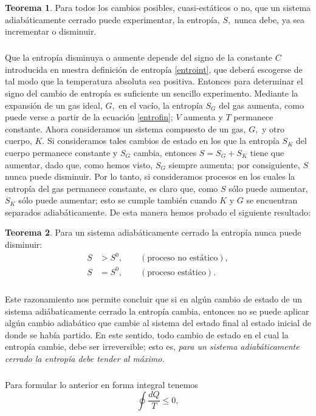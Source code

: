 \documentclass{article}
\theoremstyle{definition} \newtheorem{defi}{Definici\'on}
\theoremstyle{definition} \newtheorem{teo}{Teorema}
\theoremstyle{definition} \newtheorem{cor}{Corolario}
\begin{document}
\begin{teo}
Para todos los cambios posibles, cuasi-est\'aticos o no, que un sistema adiab\'aticamente cerrado puede experimentar, la entrop\'ia, $S,$ nunca debe, ya sea incrementar o disminuir.
\end{teo}
\subparagraph{}
Que la entrop\'ia disminuya o aumente depende del signo de la constante $C$ introducida en nuestra definici\'on de entrop\'ia \eqref{entroint}, que deber\'a escogerse de tal modo que la temperatura absoluta sea positiva. Entonces para determinar el signo del cambio de entrop\'ia es suficiente un sencillo experimento. Mediante la expansi\'on de un gas ideal, $G,$ en el vac\'io, la entrop\'ia $S_G$ del gas aumenta, como puede verse a partir de la ecuaci\'on \eqref{entrofin}; $V$ aumenta y $T$ permanece constante. Ahora consideramos un sistema compuesto de un gas, $G,$ y otro cuerpo, $K.$ Si consideramos tales cambios de estado en los que la entrop\'ia $S_K$ del cuerpo permanece constante y $S_G$ cambia, entonces $S=S_G+S_K$ tiene que aumentar, dado que, como hemos visto, $S_G$ siempre aumenta; por consiguiente, $S$ nunca puede disminuir. Por lo tanto, si consideramos procesos en los cuales la entrop\'ia del gas permanece constante, es claro que, como $S$ s\'olo puede aumentar, $S_K$ s\'olo puede aumentar; esto se cumple tambi\'en cuando $K$ y $G$ se encuentran separados adiab\'aticamente. De esta manera hemos probado el siguiente resultado:
\begin{teo}\label{teoentro}
Para un sistema adiab\'aticamente cerrado la entrop\'ia nunca puede disminuir:
\begin{align}
S&>S^0,\qquad (\text{proceso no est\'atico}),\\
S&=S^0,\qquad (\text{proceso est\'atico}).
\end{align}
\end{teo}
\subparagraph{}
Este razonamiento nos permite concluir que si en alg\'un cambio de estado de un sistema adi\'abaticamente cerrado la entrop\'ia cambia, entonces no se puede aplicar alg\'un cambio adiab\'atico que cambie al sistema del estado final al estado inicial de donde se hab\'ia partido. En este sentido, todo cambio de estado en el cual la entrop\'ia cambie, debe ser irreversible; esto es, \emph{para un sistema adiab\'aticamente cerrado la entrop\'ia debe tender al m\'aximo.}
\subparagraph{}
Para formular lo anterior en forma integral tenemos
\begin{equation}\label{entformint}
\oint \frac{dQ}{T}\leq 0,
\end{equation}
\end{document}
